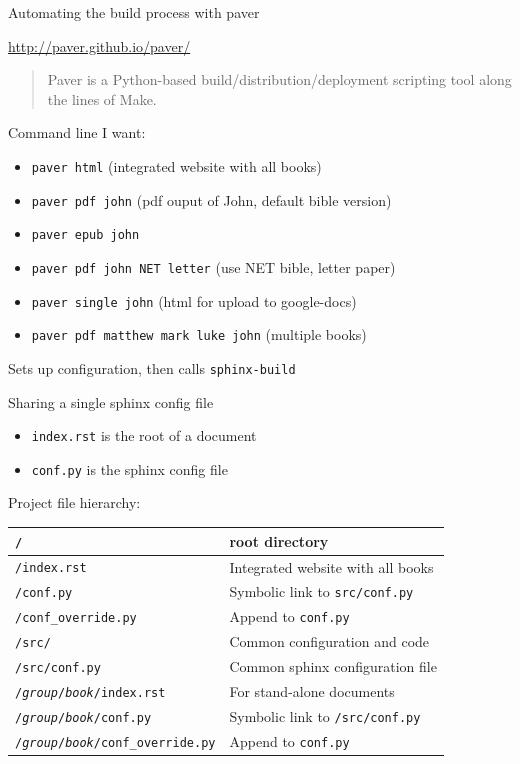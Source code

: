 \documentclass{beamer}
\begin{document}
\begin{frame}{Automating the build process with paver}

\url{http://paver.github.io/paver/}

\begin{quote}
Paver is a Python-based build/distribution/deployment 
scripting tool along the lines of Make.
\end{quote}

Command line I want:
\begin{itemize}
\item \texttt{paver html} (integrated website with all books)
\item \texttt{paver pdf john} (pdf ouput of John, default bible version)
\item \texttt{paver epub john}
\item \texttt{paver pdf john NET letter} (use NET bible, letter paper)
\item \texttt{paver single john} (html for upload to google-docs)
\item \texttt{paver pdf matthew mark luke john} (multiple books)
\end{itemize}

Sets up configuration, then calls \texttt{sphinx-build}

\end{frame}

\begin{frame}[fragile]{Sharing a single sphinx config file}

\begin{itemize}
\item \texttt{index.rst} is the root of a document
\item \texttt{conf.py} is the sphinx config file
\end{itemize}

Project file hierarchy:

\begin{tabular}{|l|l|}
\hline
\texttt{/} & root directory \\
\hline
\texttt{/index.rst} & Integrated website with all books \\
\texttt{/conf.py} & Symbolic link to \texttt{src/conf.py}\\
\texttt{/conf\_override.py} & Append to \texttt{conf.py}\\
\hline
\texttt{/src/} & Common configuration and code\\
\texttt{/src/conf.py} & Common sphinx configuration file\\
\hline
\texttt{/\emph{group}/\emph{book}/index.rst} & For stand-alone documents\\
\texttt{/\emph{group}/\emph{book}/conf.py} & Symbolic link to \texttt{/src/conf.py}\\
\texttt{/\emph{group}/\emph{book}/conf\_override.py} & Append to \texttt{conf.py}\\
\hline
\end{tabular}


\end{frame}
\end{document}
